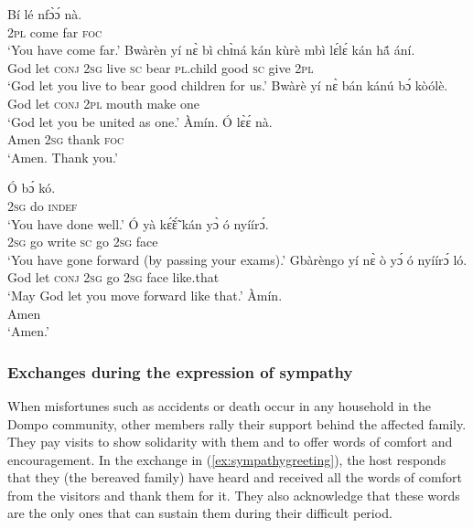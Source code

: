 \documentclass[output=paper,colorlinks,citecolor=brown]{langscibook}
\begin{document}
\ea \label{ex:congratsgreeting}
\begin{xlist}
\ex
   \gll Bí	lé	nfɔ̀ɔ́	nà.\\
\textsc{2pl}	come	far	\textsc{foc}\\
   \glt `You have come far.'   
   \ex
   \gll Bwàrèn	yí	nɛ̀	bì chɪ̀ná	kán	kùrè	mbì		lɛ́lɛ́	kán	hã́	ání.\\
God	let	\textsc{conj}	\textsc{2sg} live	\textsc{sc}	bear	\textsc{pl}.child	good	\textsc{sc}	give	\textsc{2pl}\\
   \glt `God let you live to bear good children for us.' 
\ex 
\gll Bwàrè	yí	nɛ̀	bán	kánú	bɔ́	kòólè.\\
God	let	\textsc{conj}	\textsc{2pl}	mouth	make	one\\
\glt  `God let you be united as one.'
\ex 
\gll Àmín.		Ó	lɛ̀ɛ́	nà.\\
Amen		\textsc{2sg}	thank	\textsc{foc}\\
\glt ‘Amen. Thank you.’  
\end{xlist}
\z

\ea \label{ex:congratsgreeting2}
\begin{xlist}
\ex
   \gll Ó	bɔ́	kó.\\
\textsc{2sg}	do	\textsc{indef}\\
   \glt `You have done well.'    
   \ex
   \gll Ó	yà	kɛ̃́ɛ̃́	kán	yɔ̀	ó	nyíírɔ́.\\
\textsc{2sg}	go	write	\textsc{sc}	go	\textsc{2sg}	face\\
   \glt `You have gone forward (by passing your exams).' 
   \ex 
   \gll Gbàrèngo	yí	nɛ̀	ò	yɔ́ 	ó	nyíírɔ́	ló. \\
   God		let	\textsc{conj}	\textsc{2sg}	go	\textsc{2sg}	face	like.that \\
\glt `May God let you move forward like that.'
\ex 
\gll Àmín.\\
Amen\\
\glt `Amen.'   
\end{xlist} 
\z

\subsubsection{Exchanges during the expression of sympathy}

When misfortunes such as accidents or death occur in any household in the Dompo community, other members rally their support behind the affected family. They pay visits to show solidarity with them and to offer words of comfort and encouragement. In the exchange in (\ref{ex:sympathygreeting}), the host responds that they (the bereaved family) have heard and received all the words of comfort from the visitors and thank them for it. They also acknowledge that these words are the only ones that can sustain them during their difficult period. 
\end{document}
